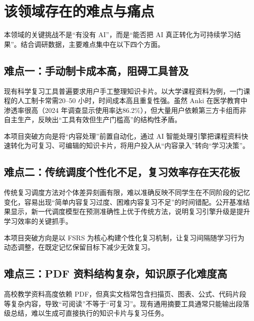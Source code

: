 \section{该领域存在的难点与痛点}

本领域的关键挑战不是“有没有 AI”，而是“能否把 AI 真正转化为可持续学习结果”。结合调研数据，主要难点集中在以下四个方面。

\subsection{难点一：手动制卡成本高，阻碍工具普及}

现有科学复习工具普遍要求用户手工整理知识卡片。以大学课程资料为例，一门课程的人工制卡常需20--50 小时，时间成本高且重复性强。虽然 Anki 在医学教育中渗透率很高（2024 年调查显示使用率达86.2\%），但大量用户依赖第三方卡组而非自主生产，反映出“工具有效但生产门槛高”的结构性矛盾。

本项目突破方向是将“内容处理”前置自动化，通过 AI 智能处理引擎把课程资料快速转化为可复习、可编辑的知识卡片，将用户投入从“内容录入”转向“学习决策”。

\subsection{难点二：传统调度个性化不足，复习效率存在天花板}

传统复习调度方法对个体差异刻画有限，难以准确反映不同学生在不同阶段的记忆变化，容易出现“简单内容复习过度、困难内容复习不足”的时间错配。公开基准结果显示，新一代调度模型在预测准确性上优于传统方法，说明复习引擎升级是提升学习效率的关键抓手。

本项目突破方向是以 FSRS 为核心构建个性化复习机制，让复习间隔随学习行为动态调整，在既定记忆保留目标下减少无效复习。

\subsection{难点三：PDF 资料结构复杂，知识原子化难度高}

高校教学资料高度依赖 PDF，但真实文档常包含扫描页、图表、公式、代码片段等复杂内容，导致“可阅读”不等于“可复习”。现有通用摘要工具通常只能输出段落级总结，难以生成可直接执行的知识卡片与复习任务。

